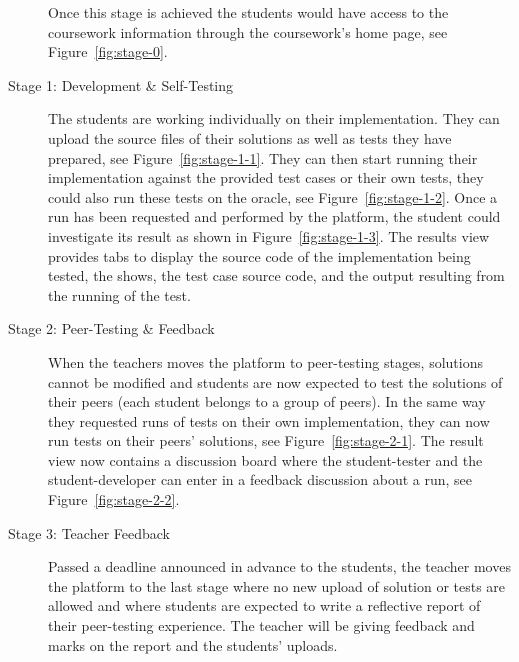 \documentclass[sigplan,10pt,review]{acmart}\settopmatter{printfolios=true}
\begin{document}
\begin{description}
  Once this stage is achieved the students would have access to the
  coursework information through the coursework's home page, see
  Figure~\ref{fig:stage-0}.
\item[Stage 1: Development \& Self-Testing] The students are working
  individually on their implementation. They can upload the source
  files of their solutions as well as tests they have prepared, see
  Figure~\ref{fig:stage-1-1}. They can then start running their
  implementation against the provided test cases or their own tests,
  they could also run these tests on the oracle, see
  Figure~\ref{fig:stage-1-2}. Once a run has been requested and
  performed by the platform, the student could investigate its result
  as shown in Figure~\ref{fig:stage-1-3}. The results view provides
  tabs to display the source code of the implementation being tested,
  the shows, the test case source code, and the output resulting from
  the running of the test.
\item[Stage 2: Peer-Testing \& Feedback] When the teachers moves the
  platform to peer-testing stages, solutions cannot be modified and
  students are now expected to test the solutions of their peers (each
  student belongs to a group of peers). In the same way they requested
  runs of tests on their own implementation, they can now run tests on
  their peers' solutions, see Figure~\ref{fig:stage-2-1}. The result
  view now contains a discussion board where the student-tester and
  the student-developer can enter in a feedback discussion about a
  run, see Figure~\ref{fig:stage-2-2}.
\item[Stage 3: Teacher Feedback] Passed a deadline announced in
  advance to the students, the teacher moves the platform to the last
  stage where no new upload of solution or tests are allowed and where
  students are expected to write a reflective report of their
  peer-testing experience. The teacher will be giving feedback and
  marks on the report and the students' uploads.
\end{description}
\end{document}
